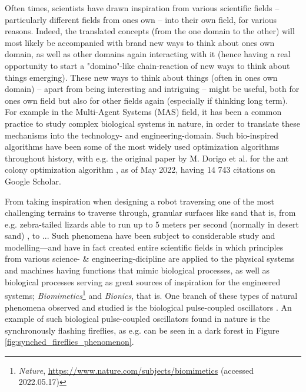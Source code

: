 Often times, scientists have drawn inspiration from various scientific fields -- particularly different fields from ones own -- into their own field, for various reasons. Indeed, the translated concepts (from the one domain to the other) will most likely be accompanied with brand new ways to think about ones own domain, as well as other domains again interacting with it (hence having a real opportunity to start a "domino"-like chain-reaction of new ways to think about things emerging). These new ways to think about things (often in ones own domain) -- apart from being interesting and intriguing -- might be useful, both for ones own field but also for other fields again (especially if thinking long term). For example in the Multi-Agent Systems (MAS) field, it has been a common practice to study complex biological systems in nature, in order to translate these mechanisms into the technology- and engineering-domain. Such bio-inspired algorithms have been some of the most widely used optimization algorithms throughout history, with e.g. the original paper by M. Dorigo et al. for the ant colony optimization algorithm \cite{dorigo_ant_2006}, as of May 2022, having 14 743 citations on Google Scholar.

From taking inspiration when designing a robot traversing one of the most challenging terrains to traverse through, granular surfaces like sand that is, from e.g. zebra-tailed lizards able to run up to 5 meters per second (normally in desert sand) \cite{sandbots}, to ... Such phenomena have been subject to considerable study and modelling—and have in fact created entire scientific fields in which principles from various science- \& engineering-dicipline are applied to the physical systems and machines having functions that mimic biological processes, as well as biological processes serving as great sources of inspiration for the engineered systems; \textit{Biomimetics}\footnote{\textit{Nature}, \url{https://www.nature.com/subjects/biomimetics} (accessed 2022.05.17)} and \textit{Bionics}, that is. One branch of these types of natural phenomena observed and studied is the biological pulse-coupled oscillators \cite{russerMinimalAssumptionsReferanser}. An example of such biological pulse-coupled oscillators found in nature is the synchronously flashing fireflies, as e.g. can be seen in a dark forest in Figure \ref{fig:synched_fireflies_phenomenon}.

